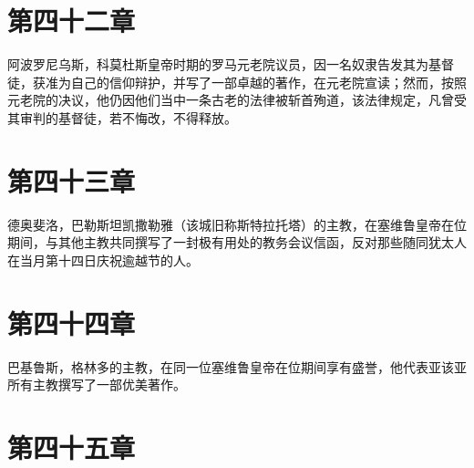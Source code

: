 
\section{第四十二章}

阿波罗尼乌斯，科莫杜斯皇帝时期的罗马元老院议员，因一名奴隶告发其为基督徒，获准为自己的信仰辩护，并写了一部卓越的著作，在元老院宣读；然而，按照元老院的决议，他仍因他们当中一条古老的法律被斩首殉道，该法律规定，凡曾受其审判的基督徒，若不悔改，不得释放。\par


\section{第四十三章}

德奥斐洛，巴勒斯坦凯撒勒雅（该城旧称斯特拉托塔）的主教，在塞维鲁皇帝在位期间，与其他主教共同撰写了一封极有用处的教务会议信函，反对那些随同犹太人在当月第十四日庆祝逾越节的人。\par


\section{第四十四章}

巴基鲁斯，格林多的主教，在同一位塞维鲁皇帝在位期间享有盛誉，他代表亚该亚所有主教撰写了一部优美著作。\par


\section{第四十五章}

